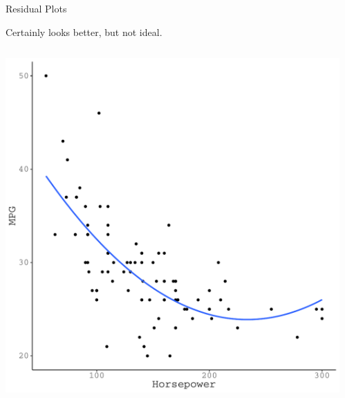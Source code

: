\documentclass{beamer}\usepackage[]{graphicx}\usepackage[]{color}
\makeatletter
\def\maxwidth{ %
  \ifdim\Gin@nat@width>\linewidth
    \linewidth
  \else
    \Gin@nat@width
  \fi
}
\newenvironment{knitrout}{}{} %
\makeatother
\begin{document}
\watermarkoff %

\begin{frame}{Residual Plots}

  Certainly looks better, but not ideal.
  \vb
  \begin{columns}
    \begin{column}{0.5\textwidth}
      
\begin{knitrout}\footnotesize
{}\color{fgcolor}

{\centering \includegraphics[width=\maxwidth]{figure/unnamed-chunk-16-1} 

}



\end{knitrout}

\end{column}

\begin{column}{0.5\textwidth}
      
\begin{knitrout}\footnotesize
{}\color{fgcolor}


\end{knitrout}
\end{column}
\end{columns}
\end{frame}
\end{document}
